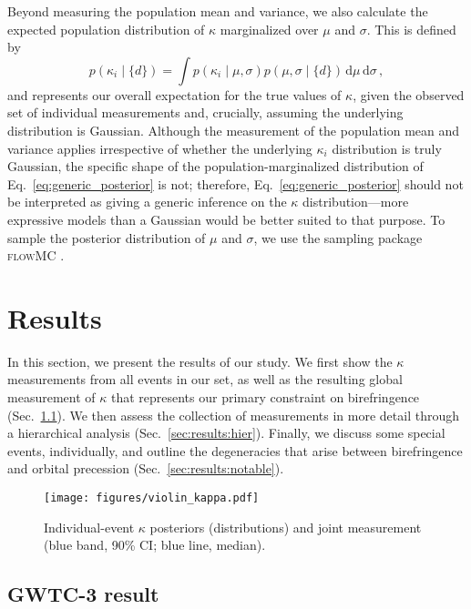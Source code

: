 \documentclass[aps,prd,twocolumn,superscriptaddress,preprintnumbers,nofootinbib]{revtex4-2}
\newcommand{\infd}{\mathrm{d}}
\begin{document}
Beyond measuring the population mean and variance, we also calculate the expected population distribution of $\kappa$ marginalized over $\mu$ and $\sigma$.
This is defined by
\begin{equation}
p(\kappa_i \mid \{d\})=\int p(\kappa_i \mid \mu,\sigma)p(\mu,\sigma\mid \{d\})\,\infd\mu\,\infd\sigma\, , 
    \label{eq:generic_posterior}
\end{equation}
and represents our overall expectation for the true values of $\kappa$, given the observed set of individual measurements and, crucially, assuming the underlying distribution is Gaussian.
Although the measurement of the population mean and variance applies irrespective of whether the underlying $\kappa_i$ distribution is truly Gaussian, the specific shape of the population-marginalized distribution of Eq.~\eqref{eq:generic_posterior} is not; therefore, Eq.~\eqref{eq:generic_posterior} should not be interpreted as giving a generic inference on the $\kappa$ distribution---more expressive models than a Gaussian would be better suited to that purpose. 
To sample the posterior distribution of $\mu$ and $\sigma$, we use the sampling package \textsc{flowMC} \citep{flowMC}.

\section{Results}
\label{sec:Results}

In this section, we present the results of our study.
We first show the $\kappa$ measurements from all events in our set, as well as the resulting global measurement of $\kappa$ that represents our primary constraint on birefringence (Sec.~\ref{sec:results:gwtc}).
We then assess the collection of measurements in more detail through a hierarchical analysis (Sec.~\ref{sec:results:hier}).
Finally, we discuss some special events, individually, and outline the degeneracies that arise between birefringence and orbital precession (Sec.~\ref{sec:results:notable}).

\begin{figure}
    \texttt{[image: figures/violin\_kappa.pdf]}
    \caption{
        Individual-event $\kappa$ posteriors (distributions) and joint measurement (blue band, 90\% CI; blue line, median).
    }
    \label{fig:violin_kappa}
\end{figure}

\subsection{GWTC-3 result}
\label{sec:results:gwtc}
\end{document}
